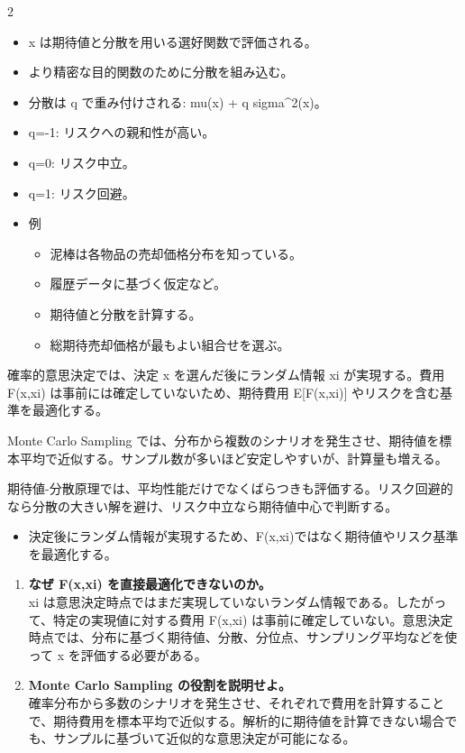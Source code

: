 \clearpage
{}
\begin{multicols}{2}\footnotesize\raggedcolumns
{}
\begin{itemize}
\item x は期待値と分散を用いる選好関数で評価される。
\item より精密な目的関数のために分散を組み込む。
\item 分散は q で重み付けされる: mu(x) + q sigma\textasciicircum{}2(x)。
\item q=-1: リスクへの親和性が高い。
\item q=0: リスク中立。
\item q=1: リスク回避。
\item 例
\begin{itemize}
\item 泥棒は各物品の売却価格分布を知っている。
\item 履歴データに基づく仮定など。
\item 期待値と分散を計算する。
\item 総期待売却価格が最もよい組合せを選ぶ。
\end{itemize}
\end{itemize}
確率的意思決定では、決定 x を選んだ後にランダム情報 xi が実現する。費用 F(x,xi) は事前には確定していないため、期待費用 E[F(x,xi)] やリスクを含む基準を最適化する。\par

Monte Carlo Sampling では、分布から複数のシナリオを発生させ、期待値を標本平均で近似する。サンプル数が多いほど安定しやすいが、計算量も増える。\par

期待値-分散原理では、平均性能だけでなくばらつきも評価する。リスク回避的なら分散の大きい解を避け、リスク中立なら期待値中心で判断する。\par
{}
\begin{itemize}
\item 決定後にランダム情報が実現するため、F(x,xi)ではなく期待値やリスク基準を最適化する。
\end{itemize}
\begin{enumerate}
\item \textbf{なぜ F(x,xi) を直接最適化できないのか。}\\xi は意思決定時点ではまだ実現していないランダム情報である。したがって、特定の実現値に対する費用 F(x,xi) は事前に確定していない。意思決定時点では、分布に基づく期待値、分散、分位点、サンプリング平均などを使って x を評価する必要がある。
\item \textbf{Monte Carlo Sampling の役割を説明せよ。}\\確率分布から多数のシナリオを発生させ、それぞれで費用を計算することで、期待費用を標本平均で近似する。解析的に期待値を計算できない場合でも、サンプルに基づいて近似的な意思決定が可能になる。
\end{enumerate}
\end{multicols}


